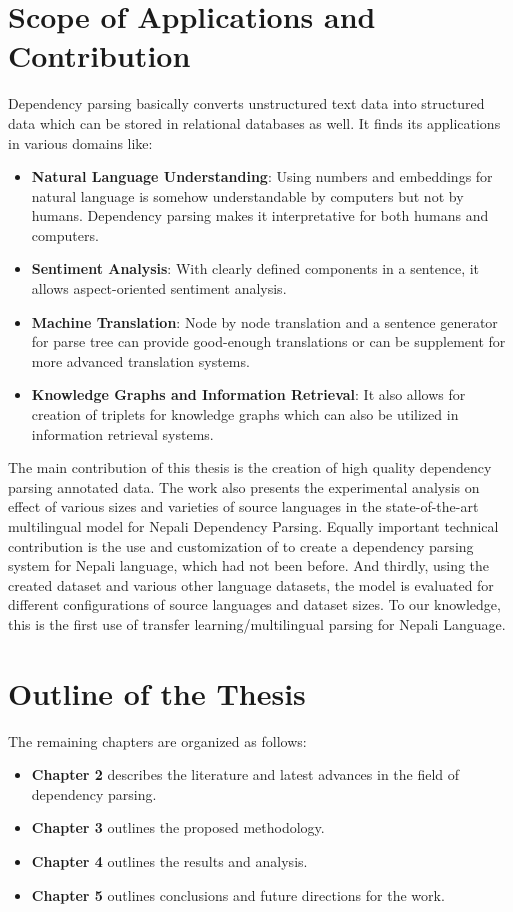 \section {Scope of Applications and Contribution}
Dependency parsing basically converts unstructured text data into structured
data which can be stored in relational databases as well. It finds its
applications in various domains like:
\begin{itemize}
    \item \textbf{Natural Language Understanding}: Using numbers and embeddings
        for natural language is somehow understandable by computers but not by
        humans. Dependency parsing makes it interpretative for both humans and computers.
    \item \textbf{Sentiment Analysis}: With clearly defined components in a
        sentence, it allows aspect-oriented sentiment analysis.
    \item \textbf{Machine Translation}: Node by node translation and a sentence
        generator for parse tree can provide good-enough translations or can be
        supplement for more advanced translation systems.
    \item \textbf{Knowledge Graphs and Information Retrieval}: It also allows
        for creation of triplets for knowledge graphs which can also be
        utilized in information retrieval systems.
\end{itemize}

The main contribution of this thesis is the creation of high quality dependency
parsing annotated data. The work also presents the experimental analysis on
effect of various sizes and varieties of source languages in the
state-of-the-art multilingual model \cite{steps-parser} for Nepali Dependency
Parsing. Equally important technical contribution is the use and customization
of \cite{steps-parser} to create a dependency parsing system for Nepali
language, which had not been before. And thirdly, using the created dataset and
various other language datasets, the model is evaluated for different
configurations of source languages and dataset sizes. To our knowledge, this is
the first use of transfer learning/multilingual parsing for Nepali Language.



\section{Outline of the Thesis}
The remaining chapters are organized as follows:
\begin{itemize}
    \item \textbf{Chapter 2} describes the literature and latest advances in the field of dependency parsing.
    \item \textbf{Chapter 3} outlines the proposed methodology.
    \item \textbf{Chapter 4} outlines the results and analysis.
    \item \textbf{Chapter 5} outlines conclusions and future directions for the work.
\end{itemize}

